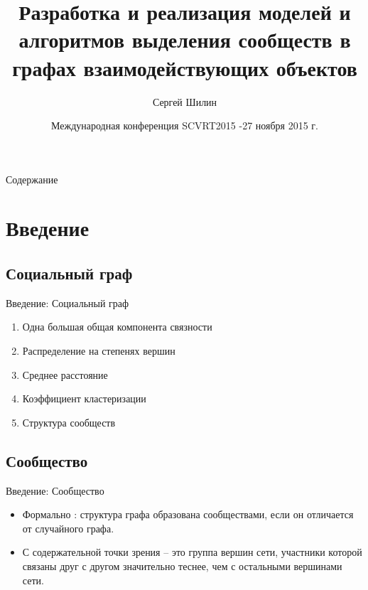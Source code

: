\documentclass[11pt,pdf,hyperref={unicode}]{beamer}
\title[Выделение сообществ в графах \hspace*{1cm} SCVRT2015]{Разработка и реализация моделей и алгоритмов выделения сообществ в графах взаимодействующих объектов}
\author[C. Шилин]{Сергей Шилин \vspace{-0.6cm}}
\date[SCVRT2015]{Международная конференция SCVRT2015 \break 24-27 ноября 2015 г. }
\begin{document}
\frame{\titlepage}
\begin{frame}{Содержание}
	\tableofcontents
\end{frame}

\section{Введение} %
\label{sec:intro}

	\subsection{Социальный граф} %
	\label{sub:socgraph}
		\begin{frame}{Введение: Социальный граф} 
			\begin{enumerate}
				\item Одна большая общая компонента связности
				\pause \item Распределение на степенях вершин
				\pause \item Среднее расстояние
				\pause \item Коэффициент кластеризации
				\pause \item Структура сообществ
			\end{enumerate}
		\end{frame}

	\subsection{Сообщество} %
	\label{sub:community}
		\begin{frame}{Введение: Сообщество}
			\begin{itemize}
				\item Формально : структура графа образована сообществами, если он отличается от случайного графа.
				\pause \item С содержательной точки зрения -- это группа вершин сети, участники которой связаны друг с другом значительно теснее, чем с остальными вершинами сети.
			\end{itemize}
		\end{frame}
\end{document}

